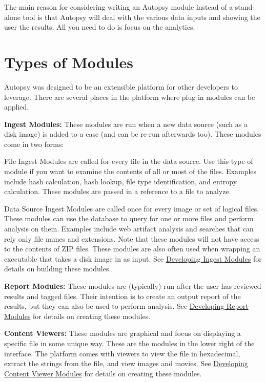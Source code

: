 The main reason for considering writing an Autopsy module instead of a stand-\/alone tool is that Autopsy will deal with the various data inputs and showing the user the results. All you need to do is focus on the analytics.\hypertarget{platform_page_platform_frameworks}{}\section{Types of Modules}\label{platform_page_platform_frameworks}
Autopsy was designed to be an extensible platform for other developers to leverage. There are several places in the platform where plug-\/in modules can be applied.
\begin{DoxyItemize}
\item {\bfseries Ingest Modules\+:} These modules are run when a new data source (such as a disk image) is added to a case (and can be re-\/run afterwards too). These modules come in two forms\+:
\begin{DoxyItemize}
\item File Ingest Modules are called for every file in the data source. Use this type of module if you want to examine the contents of all or most of the files. Examples include hash calculation, hash lookup, file type identification, and entropy calculation. These modules are passed in a reference to a file to analyze.
\item Data Source Ingest Modules are called once for every image or set of logical files. These modules can use the database to query for one or more files and perform analysis on them. Examples include web artifact analysis and searches that can rely only file names and extensions. Note that these modules will not have access to the contents of Z\+IP files. These modules are also often used when wrapping an executable that takes a disk image in as input. See \hyperlink{mod_ingest_page}{Developing Ingest Modules} for details on building these modules.
\end{DoxyItemize}
\item {\bfseries Report Modules\+:} These modules are (typically) run after the user has reviewed results and tagged files. Their intention is to create an output report of the results, but they can also be used to perform analysis. See \hyperlink{mod_report_page}{Developing Report Modules} for details on creating these modules.
\item {\bfseries Content Viewers\+:} These modules are graphical and focus on displaying a specific file in some unique way. These are the modules in the lower right of the interface. The platform comes with viewers to view the file in hexadecimal, extract the strings from the file, and view images and movies. See \hyperlink{mod_content_page}{Developing Content Viewer Modules} for details on creating these modules.

\end{DoxyItemize}
